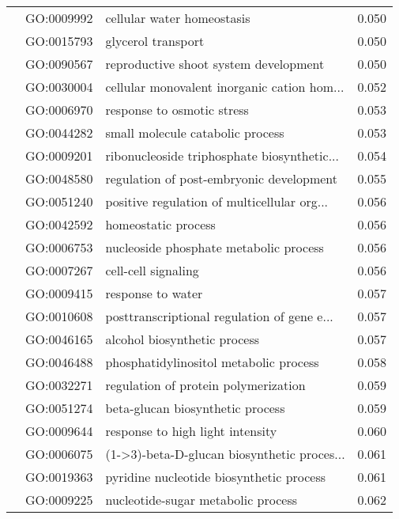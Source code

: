 \begin{longtable}{lllr}
   & GO:0009992 &                   cellular water homeostasis &         0.050 \\
   & GO:0015793 &                           glycerol transport &         0.050 \\
   & GO:0090567 &        reproductive shoot system development &         0.050 \\
   & GO:0030004 &  cellular monovalent inorganic cation hom... &         0.052 \\
   & GO:0006970 &                   response to osmotic stress &         0.053 \\
   & GO:0044282 &             small molecule catabolic process &         0.053 \\
   & GO:0009201 &  ribonucleoside triphosphate biosynthetic... &         0.054 \\
   & GO:0048580 &     regulation of post-embryonic development &         0.055 \\
   & GO:0051240 &  positive regulation of multicellular org... &         0.056 \\
   & GO:0042592 &                          homeostatic process &         0.056 \\
   & GO:0006753 &       nucleoside phosphate metabolic process &         0.056 \\
   & GO:0007267 &                          cell-cell signaling &         0.056 \\
   & GO:0009415 &                            response to water &         0.057 \\
   & GO:0010608 &  posttranscriptional regulation of gene e... &         0.057 \\
   & GO:0046165 &                 alcohol biosynthetic process &         0.057 \\
   & GO:0046488 &       phosphatidylinositol metabolic process &         0.058 \\
   & GO:0032271 &         regulation of protein polymerization &         0.059 \\
   & GO:0051274 &             beta-glucan biosynthetic process &         0.059 \\
   & GO:0009644 &             response to high light intensity &         0.060 \\
   & GO:0006075 &  (1->3)-beta-D-glucan biosynthetic proces... &         0.061 \\
   & GO:0019363 &     pyridine nucleotide biosynthetic process &         0.061 \\
   & GO:0009225 &           nucleotide-sugar metabolic process &         0.062 \\

\end{longtable}
